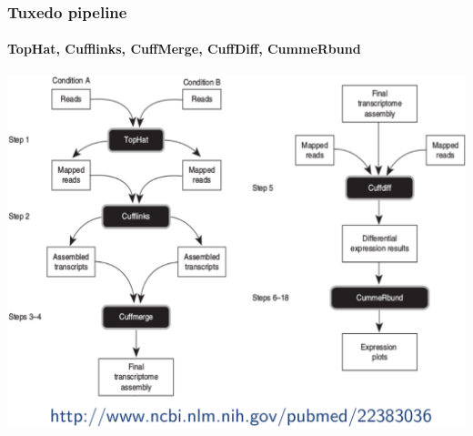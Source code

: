 \documentclass{beamer}			  %
\begin{document}
\begin{frame}
\frametitle{Tuxedo pipeline}
\framesubtitle{TopHat, Cufflinks, CuffMerge, CuffDiff, CummeRbund}
	\begin{center}
		\includegraphics[height=0.75\textheight]{figures/dge_07p.png}
	\end{center}
\end{frame}

\end{document}
